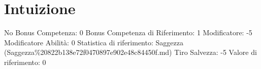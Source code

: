 \section{Intuizione}\label{intuizione}

\begin{description}
\tightlist
\item[Tags: ABI]
No Bonus Competenza: 0 Bonus Competenza di Riferimento: 1 Modificatore:
-5 Modificatore Abilità: 0 Statistica di riferimento: Saggezza
(Saggezza\%20822b138e72f0470897e902e48c84450f.md) Tiro Salvezza: -5
Valore di riferimento: 0
\end{description}
